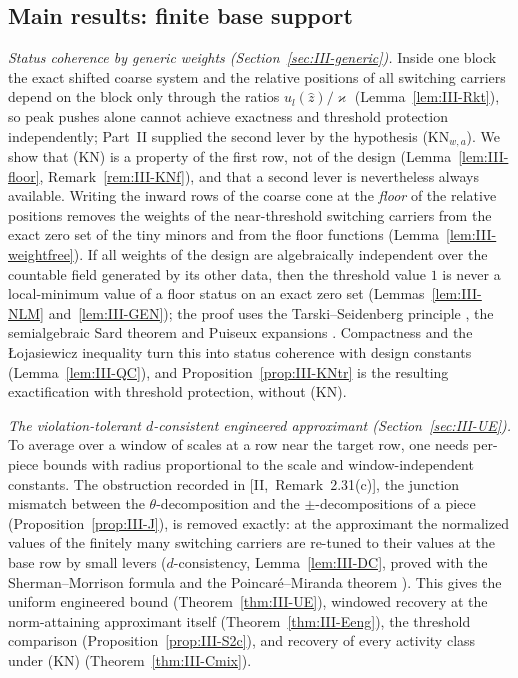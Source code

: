 \documentclass[10pt]{amsart}
\theoremstyle{definition}
\theoremstyle{remark}
\newcommand{\zh}{\hat z}
\begin{document}
\subsection{Main results: finite base support}
\emph{Status coherence by generic weights (Section~\ref{sec:III-generic}).}
Inside one block the exact shifted coarse system and the relative positions
of all switching carriers depend on the block only through the ratios
$u_l(\zh)/\varkappa$ (Lemma~\ref{lem:III-Rkt}), so peak pushes alone cannot
achieve exactness and threshold protection independently; Part~II supplied
the second lever by the hypothesis (KN$_{w,a}$).  We show that (KN) is a
property of the first row, not of the design (Lemma~\ref{lem:III-floor},
Remark~\ref{rem:III-KNf}), and that a second lever is nevertheless always
available.  Writing the inward rows of the coarse cone at the \emph{floor}
of the relative positions removes the weights of the near-threshold
switching carriers from the exact zero set of the tiny minors and from the
floor functions (Lemma~\ref{lem:III-weightfree}).  If all weights of the
design are algebraically independent over the countable field generated by
its other data, then the threshold value $1$ is never a local-minimum value
of a floor status on an exact zero set (Lemmas~\ref{lem:III-NLM}
and~\ref{lem:III-GEN}); the proof uses the Tarski--Seidenberg principle
\cite{Tarski,Seidenberg}, the semialgebraic Sard theorem \cite{BCR} and
Puiseux expansions \cite{vdDries}.  Compactness and the {\L}ojasiewicz
inequality turn this into status coherence with design constants
(Lemma~\ref{lem:III-QC}), and Proposition~\ref{prop:III-KNtr} is the
resulting exactification with threshold protection, without (KN).

\emph{The violation-tolerant $d$-consistent engineered approximant
(Section~\ref{sec:III-UE}).}  To average over a window of scales at a row
near the target row, one needs per-piece bounds with radius proportional to
the scale and window-independent constants.  The obstruction recorded in
[II,~Remark~2.31(c)], the junction mismatch between the
$\theta$-decomposition and the $\pm$-decompositions of a piece
(Proposition~\ref{prop:III-J}), is removed exactly: at the approximant the
normalized values of the finitely many switching carriers are re-tuned to
their values at the base row by small levers ($d$-consistency,
Lemma~\ref{lem:III-DC}, proved with the Sherman--Morrison formula and the
Poincar\'e--Miranda theorem \cite{Miranda}).  This gives the uniform
engineered bound (Theorem~\ref{thm:III-UE}), windowed recovery at the
norm-attaining approximant itself (Theorem~\ref{thm:III-Eeng}), the
threshold comparison (Proposition~\ref{prop:III-S2c}), and recovery of
every activity class under (KN) (Theorem~\ref{thm:III-Cmix}).
\end{document}
